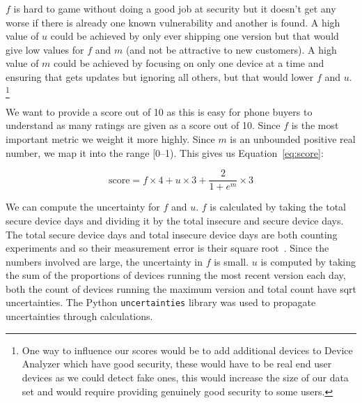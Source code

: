$f$ is hard to game without doing a good job at security but it doesn't get any worse if there is already one known vulnerability and another is found.
A high value of $u$ could be achieved by only ever shipping one version but that would give low values for $f$ and $m$ (and not be attractive to new customers).
A high value of $m$ could be achieved by focusing on only one device at a time and ensuring that gets updates but ignoring all others, but that would lower $f$ and $u$.
\footnote{One way to influence our scores would be to add additional devices to Device Analyzer which have good security, these would have to be real end user devices as we could detect fake ones, this would increase the size of our data set and would require providing genuinely good security to some users.}

We want to provide a score out of 10 as this is easy for phone buyers to understand as many ratings are given as a score out of 10.
Since $f$ is the most important metric we weight it more highly.
Since $m$ is an unbounded positive real number, we map it into the range [0--1).
This gives us Equation~\ref{eq:score}:

\begin{equation}
\mathrm{score} = f\times 4 + u \times 3 + \frac{2}{1+e^m} \times 3 \label{eq:score}
\end{equation}

We can compute the uncertainty for $f$ and $u$.
$f$ is calculated by taking the total secure device days and dividing it by the total insecure and secure device days.
The total secure device days and total insecure device days are both counting experiments and so their measurement error is their square root~\cite{Taylor1997}.
Since the numbers involved are large, the uncertainty in $f$ is small.
$u$ is computed by taking the sum of the proportions of devices running the most recent version each day, both the count of devices running the maximum version and total count have sqrt uncertainties.
The Python \texttt{uncertainties} library was used to propagate uncertainties through calculations.


